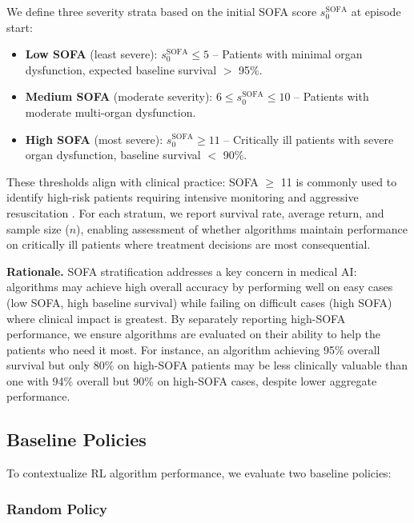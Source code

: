 We define three severity strata based on the initial SOFA score $s_0^{\text{SOFA}}$ at episode start:
\begin{itemize}
    \item \textbf{Low SOFA} (least severe): $s_0^{\text{SOFA}} \leq 5$ -- Patients with minimal organ dysfunction, expected baseline survival $>$ 95\%.
    \item \textbf{Medium SOFA} (moderate severity): $6 \leq s_0^{\text{SOFA}} \leq 10$ -- Patients with moderate multi-organ dysfunction.
    \item \textbf{High SOFA} (most severe): $s_0^{\text{SOFA}} \geq 11$ -- Critically ill patients with severe organ dysfunction, baseline survival $<$ 90\%.
\end{itemize}

These thresholds align with clinical practice: SOFA $\geq$ 11 is commonly used to identify high-risk patients requiring intensive monitoring and aggressive resuscitation \citep{rhodes2017ssc}. For each stratum, we report survival rate, average return, and sample size ($n$), enabling assessment of whether algorithms maintain performance on critically ill patients where treatment decisions are most consequential.

\textbf{Rationale.} SOFA stratification addresses a key concern in medical AI: algorithms may achieve high overall accuracy by performing well on easy cases (low SOFA, high baseline survival) while failing on difficult cases (high SOFA) where clinical impact is greatest. By separately reporting high-SOFA performance, we ensure algorithms are evaluated on their ability to help the patients who need it most. For instance, an algorithm achieving 95\% overall survival but only 80\% on high-SOFA patients may be less clinically valuable than one with 94\% overall but 90\% on high-SOFA cases, despite lower aggregate performance.

\subsection{Baseline Policies}\label{sec:methods:baselines}

To contextualize RL algorithm performance, we evaluate two baseline policies:

\subsubsection{Random Policy}

